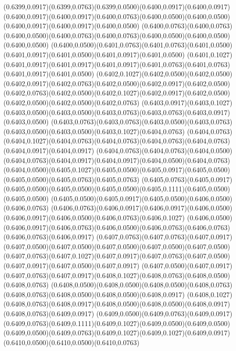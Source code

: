 (0.6399,0.0917)(0.6399,0.0763)(0.6399,0.0500)(0.6400,0.0917)(0.6400,0.0917)
\PST@Solid(0.6400,0.0917)(0.6400,0.0917)(0.6400,0.0763)(0.6400,0.0500)(0.6400,0.0500)(0.6400,0.0917)(0.6400,0.0917)(0.6400,0.0500)
(0.6400,0.0763)(0.6400,0.0763)(0.6400,0.0500)(0.6400,0.0763)(0.6400,0.0763)(0.6400,0.0500)(0.6400,0.0500)(0.6400,0.0500)
(0.6400,0.0500)(0.6401,0.0763)(0.6401,0.0763)(0.6401,0.0500)(0.6401,0.0917)(0.6401,0.0500)(0.6401,0.0917)(0.6401,0.0500)
(0.6401,0.1027)(0.6401,0.0917)(0.6401,0.0917)(0.6401,0.0917)(0.6401,0.0763)(0.6401,0.0763)(0.6401,0.0917)(0.6401,0.0500)
(0.6402,0.1027)(0.6402,0.0500)(0.6402,0.0500)(0.6402,0.0917)(0.6402,0.0763)(0.6402,0.0500)(0.6402,0.0917)(0.6402,0.0500)
(0.6402,0.0763)(0.6402,0.0500)(0.6402,0.1027)(0.6402,0.0917)(0.6402,0.0500)(0.6402,0.0500)(0.6402,0.0500)(0.6402,0.0763)
(0.6403,0.0917)(0.6403,0.1027)(0.6403,0.0500)(0.6403,0.0500)(0.6403,0.0763)(0.6403,0.0763)(0.6403,0.0917)(0.6403,0.0500)
(0.6403,0.0763)(0.6403,0.0763)(0.6403,0.0500)(0.6403,0.0763)(0.6403,0.0500)(0.6403,0.0500)(0.6403,0.1027)(0.6404,0.0763)
(0.6404,0.0763)(0.6404,0.1027)(0.6404,0.0763)(0.6404,0.0763)(0.6404,0.0763)(0.6404,0.0763)(0.6404,0.0917)(0.6404,0.0917)
(0.6404,0.0763)(0.6404,0.0763)(0.6404,0.0500)(0.6404,0.0763)(0.6404,0.0917)(0.6404,0.0917)(0.6404,0.0500)(0.6404,0.0763)
(0.6404,0.0500)(0.6405,0.1027)(0.6405,0.0500)(0.6405,0.0917)(0.6405,0.0500)(0.6405,0.0500)(0.6405,0.0763)(0.6405,0.0763)
(0.6405,0.0763)(0.6405,0.0917)(0.6405,0.0500)(0.6405,0.0500)(0.6405,0.0500)(0.6405,0.1111)(0.6405,0.0500)(0.6405,0.0500)
(0.6405,0.0500)(0.6405,0.0917)(0.6405,0.0500)(0.6406,0.0500)(0.6406,0.0763)
\PST@Solid(0.6406,0.0763)(0.6406,0.0917)(0.6406,0.0917)(0.6406,0.0500)(0.6406,0.0917)(0.6406,0.0500)(0.6406,0.0763)(0.6406,0.1027)
(0.6406,0.0500)(0.6406,0.0917)(0.6406,0.0763)(0.6406,0.0500)(0.6406,0.0763)(0.6406,0.0763)(0.6406,0.0763)(0.6406,0.0917)
(0.6407,0.0763)(0.6407,0.0763)(0.6407,0.0917)(0.6407,0.0500)(0.6407,0.0500)(0.6407,0.0500)(0.6407,0.0500)(0.6407,0.0500)
(0.6407,0.0763)(0.6407,0.1027)(0.6407,0.0917)(0.6407,0.0763)(0.6407,0.0500)(0.6407,0.0917)(0.6407,0.0500)(0.6407,0.0917)
(0.6407,0.0500)(0.6407,0.0917)(0.6407,0.0763)(0.6407,0.0917)(0.6408,0.1027)(0.6408,0.0763)(0.6408,0.0500)(0.6408,0.0763)
(0.6408,0.0500)(0.6408,0.0500)(0.6408,0.0500)(0.6408,0.0763)(0.6408,0.0763)(0.6408,0.0500)(0.6408,0.0500)(0.6408,0.0917)
(0.6408,0.1027)(0.6408,0.0763)(0.6408,0.0917)(0.6408,0.0500)(0.6408,0.0500)(0.6408,0.0917)(0.6408,0.0763)(0.6409,0.0917)
(0.6409,0.0500)(0.6409,0.0763)(0.6409,0.0917)(0.6409,0.0763)(0.6409,0.1111)(0.6409,0.1027)(0.6409,0.0500)(0.6409,0.0500)
(0.6409,0.0500)(0.6409,0.0763)(0.6409,0.1027)(0.6409,0.1027)(0.6409,0.0917)(0.6410,0.0500)(0.6410,0.0500)(0.6410,0.0763)
